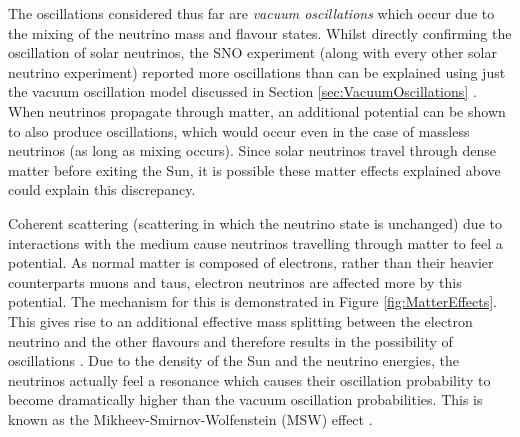 The oscillations considered thus far are \textit{vacuum oscillations} which occur due to the mixing of the neutrino mass and flavour states.  Whilst directly confirming the oscillation of solar neutrinos, the SNO experiment (along with every other solar neutrino experiment) reported more oscillations than can be explained using just the vacuum oscillation model discussed in Section \ref{sec:VacuumOscillations} \cite{Bahcall2002,Smirnov2003}.  When neutrinos propagate through matter, an additional potential can be shown to also produce oscillations, which would occur even in the case of massless neutrinos (as long as mixing occurs).  Since solar neutrinos travel through dense matter before exiting the Sun, it is possible these matter effects explained above could explain this discrepancy.

Coherent scattering (scattering in which the neutrino state is unchanged) due to interactions with the medium cause neutrinos travelling through matter to feel a potential.  As normal matter is composed of electrons, rather than their heavier counterparts muons and taus, electron neutrinos are affected more by this potential.  The mechanism for this is demonstrated in Figure \ref{fig:MatterEffects}.  This gives rise to an additional effective mass splitting between the electron neutrino and the other flavours and therefore results in the possibility of oscillations \cite{Wolfenstein1978}.  Due to the density of the Sun and the neutrino energies, the neutrinos actually feel a resonance which causes their oscillation probability to become dramatically higher than the vacuum oscillation probabilities.  This is known as the Mikheev-Smirnov-Wolfenstein (MSW) effect \cite{MS1985,MS1986}.

